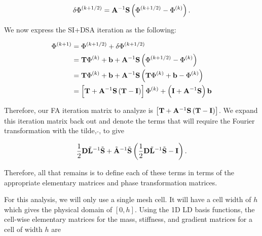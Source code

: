 \begin{equation}
\label{eq::App_DSA_1D_diff_corr}
 \delta \Phi^{(k+1/2)} = {\bf A}^{-1} {\bf S}\left( \Phi^{(k+1/2)} -  \Phi^{(k)}   \right) .
\end{equation}

\noindent We now express the SI+DSA iteration as the following:

\begin{equation}
\label{eq::App_DSA_1D_iter}
\begin{aligned}
 \Phi^{(k+1)} &= \Phi^{(k+1/2)} +   \delta \Phi^{(k+1/2)}\\
 &= {\bf T}\Phi^{(k)} + {\bf b} +  {\bf A}^{-1} {\bf S}\left( \Phi^{(k+1/2)} -  \Phi^{(k)}   \right) \\
 &= {\bf T}\Phi^{(k)} + {\bf b} +  {\bf A}^{-1} {\bf S}\left( {\bf T}\Phi^{(k)} + {\bf b} -  \Phi^{(k)}   \right) \\
  &= \left[  {\bf T} + {\bf A}^{-1} {\bf S}\left( {\bf T} -  {\bf I} \right)  \right] \Phi^{(k)} + \left( {\bf I} +  {\bf A}^{-1} {\bf S}  \right){\bf b}
\end{aligned}
\end{equation}

\noindent Therefore, our FA iteration matrix to analyze is $\left[  {\bf T} + {\bf A}^{-1} {\bf S}\left( {\bf T} -  {\bf I} \right)  \right]$. We expand this iteration matrix back out and denote the terms that will require the Fourier transformation with the tilde, $\tilde{}$, to give

\begin{equation}
\label{eq::App_DSA_1D_FA_mat}
\frac{1}{2} {\bf D} \tilde{{\bf L}}^{-1} \tilde{{\bf S}} + \tilde{{\bf A}}^{-1} \tilde{{\bf S}}\left( \frac{1}{2} {\bf D} \tilde{{\bf L}}^{-1} \tilde{{\bf S}} -  {\bf I} \right).
\end{equation}

\noindent Therefore, all that remains is to define each of these terms in terms of the appropriate elementary matrices and phase transformation matrices.

For this analysis, we will only use a single mesh cell. It will have a cell width of $h$ which gives the physical domain of $[0,h]$. Using the 1D LD basis functions, the cell-wise elementary matrices for the mass, stiffness, and gradient matrices for a cell of width $h$ are

